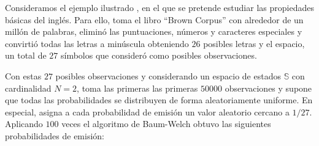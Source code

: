 \begin{exampleth}
Consideramos el ejemplo ilustrado \cite{Stamp}, en el que se pretende estudiar las propiedades básicas del inglés. Para ello, toma el libro \enquote{Brown Corpus} con alrededor de un millón de palabras, eliminó las puntuaciones, números y caracteres especiales y convirtió todas las letras a minúscula obteniendo $26$ posibles letras y el espacio, un total de $27$ símbolos que consideró como posibles observaciones.

Con estas $27$ posibles observaciones y considerando un espacio de estados $\mathbb{S}$ con cardinalidad $N=2$, toma las primeras las primeras $50000$ observaciones y supone que todas las probabilidades se distribuyen de forma aleatoriamente uniforme. En especial, asigna a cada probabilidad de emisión un valor aleatorio cercano a $1/27$. Aplicando $100$ veces el algoritmo de Baum-Welch obtuvo las siguientes probabilidades de emisión:  



\end{exampleth}
